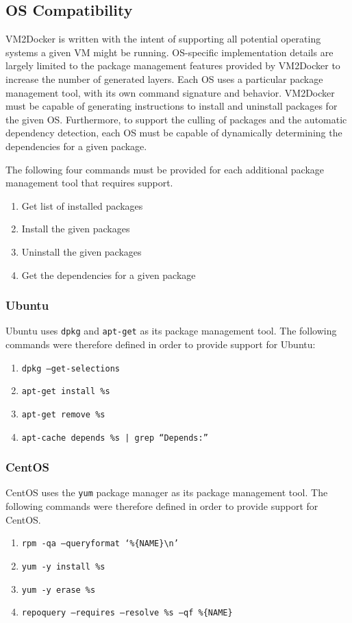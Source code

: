 \subsection{OS Compatibility}
VM2Docker is written with the intent of supporting all potential operating systems a given VM might be running. OS-specific implementation details are largely limited to the package management features provided by VM2Docker to increase the number of generated layers. Each OS uses a particular package management tool, with its own command signature and behavior. VM2Docker must be capable of generating instructions to install and uninstall packages for the given OS. Furthermore, to support the culling of packages and the automatic dependency detection, each OS must be capable of dynamically determining the dependencies for a given package.

The following four commands must be provided for each additional package management tool that requires support. 
\begin{enumerate}
\item Get list of installed packages
\item Install the given packages
\item Uninstall the given packages
\item Get the dependencies for a given package
\end{enumerate}

\subsubsection{Ubuntu}
Ubuntu uses \texttt{dpkg} and \texttt{apt-get} as its package management tool. The following commands were therefore defined in order to provide support for Ubuntu:
\begin{enumerate}
\item \texttt{dpkg --get-selections}
\item \texttt{apt-get install \%s}
\item \texttt{apt-get remove \%s}
\item \texttt{apt-cache depends \%s | grep ``Depends:''}
\end{enumerate}
\subsubsection{CentOS}
CentOS uses the \texttt{yum} package manager as its package management tool. The following commands were therefore defined in order to provide support for CentOS.
\begin{enumerate}
\item \texttt{rpm -qa --queryformat `\%\{NAME\}\textbackslash n'}
\item \texttt{yum -y install \%s}
\item \texttt{yum -y erase \%s}
\item \texttt{repoquery --requires --resolve \%s --qf \%\{NAME\}}
\end{enumerate}

